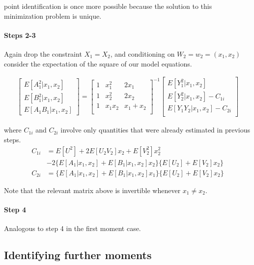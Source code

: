 \noindent point identification is once more possible because the solution to this minimization problem is unique.

\paragraph{Steps 2-3} Again drop the constraint $X_1 = X_2$, and conditioning on $W_2 = w_2 = (x_1, x_2)$ consider the expectation of the square of our model equations.

\begin{align}
\begin{bmatrix}
  E[A_1^2 | x_{1}, x_{2}] \\ 
  E[B_1^2 | x_{1}, x_{2}]  \\ 
  E[A_1 B_1 | x_{1}, x_{2}]
\end{bmatrix}
=
\begin{bmatrix}
  1 & x_{1}^2 & 2x_{1} \\ 
  1 & x_{2}^2 & 2x_{2} \\ 
  1 & x_{1}x_{2} & x_{1} + x_{2} \\ 
\end{bmatrix}^{-1}
\begin{bmatrix}
  E[Y_1^2 | x_{1}, x_{2}] \\
  E[Y_2^2 | x_{1}, x_{2}] - C_{1i} \\
  E[Y_1 Y_2 | x_{1}, x_{2}] - C_{2i} \\
\end{bmatrix}
\end{align}

\noindent where $C_{1i}$ and $C_{2i}$ involve only quantities that were already estimated in previous steps.
\begin{align}
C_{1i} &= E[U^2] + 2E[U_2 V_2] x_{2} +  E[V_2^2]x_{2}^2 \\
      &- 2\{
E[A_1 | x_{1}, x_{2}] +
E[B_1 | x_{1}, x_{2}]x_{2}
\}
\{
E[U_2] + E[V_2]x_{2}
\}
\\
C_{2i} &= 
\{ 
  E[A_1 | x_{1}, x_{2}] + E[B_1 | x_{1}, x_{2}]x_{1}
\}
\{
E[U_2] + E[V_2]x_{2}
\}
\end{align}

Note that the relevant matrix above is invertible whenever $x_1 \neq x_2$. 

\paragraph{Step 4} Analogous to step 4 in the first moment case.


\subsection{Identifying further moments}

